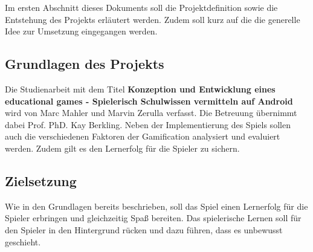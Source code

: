 Im ersten Abschnitt dieses Dokuments soll die Projektdefinition sowie die Entstehung des Projekts erläutert werden. Zudem soll kurz auf die die generelle Idee zur Umsetzung eingegangen werden.

\subsection{Grundlagen des Projekts}
Die Studienarbeit mit dem Titel \textbf{Konzeption und Entwicklung eines educational games - Spielerisch Schulwissen vermitteln auf Android} wird von Marc Mahler und Marvin Zerulla verfasst. Die Betreuung übernimmt dabei Prof. PhD. Kay Berkling. Neben der Implementierung des Spiels sollen auch die verschiedenen Faktoren der Gamification analysiert und evaluiert werden. Zudem gilt es den Lernerfolg für die Spieler zu sichern.

\subsection{Zielsetzung}
Wie in den Grundlagen bereits beschrieben, soll das Spiel einen Lernerfolg für die Spieler erbringen und gleichzeitig Spaß bereiten.
Das spielerische Lernen soll für den Spieler in den Hintergrund rücken und dazu führen, dass es unbewusst geschieht.

